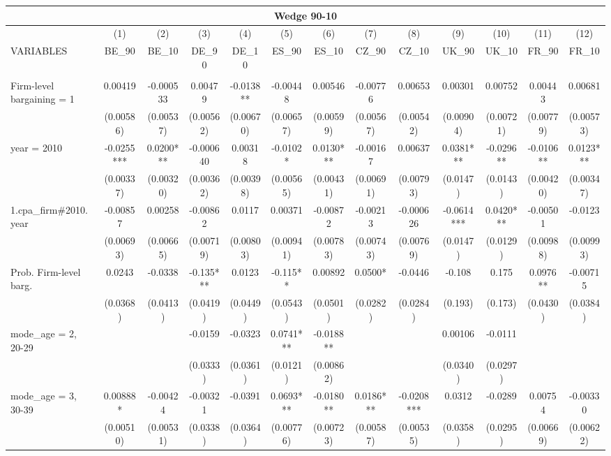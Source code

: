 \documentclass[]{article}
\begin{document}
\begin{tabular}{lcccccccccccc}
\multicolumn{13}{c}{Wedge 90-10} \\ \hline
 & (1) & (2) & (3) & (4) & (5) & (6) & (7) & (8) & (9) & (10) & (11) & (12) \\
VARIABLES & BE\_90 & BE\_10 & DE\_90 & DE\_10 & ES\_90 & ES\_10 & CZ\_90 & CZ\_10 & UK\_90 & UK\_10 & FR\_90 & FR\_10 \\ \hline
 &  &  &  &  &  &  &  &  &  &  &  &  \\
Firm-level bargaining = 1 & 0.00419 & -0.000533 & 0.00479 & -0.0138** & -0.00448 & 0.00546 & -0.00776 & 0.00653 & 0.00301 & 0.00752 & 0.00443 & 0.00681 \\
 & (0.00586) & (0.00537) & (0.00562) & (0.00670) & (0.00657) & (0.00599) & (0.00567) & (0.00542) & (0.00904) & (0.00721) & (0.00779) & (0.00573) \\
year = 2010 & -0.0255*** & 0.0200*** & -0.000640 & 0.00318 & -0.0102* & 0.0130*** & -0.00167 & 0.00637 & 0.0381*** & -0.0296** & -0.0106** & 0.0123*** \\
 & (0.00337) & (0.00320) & (0.00362) & (0.00398) & (0.00565) & (0.00431) & (0.00691) & (0.00793) & (0.0147) & (0.0143) & (0.00420) & (0.00347) \\
1.cpa\_firm\#2010.year & -0.00857 & 0.00258 & -0.00862 & 0.0117 & 0.00371 & -0.00872 & -0.00213 & -0.000626 & -0.0614*** & 0.0420*** & -0.00501 & -0.0123 \\
 & (0.00693) & (0.00665) & (0.00719) & (0.00803) & (0.00941) & (0.00783) & (0.00743) & (0.00769) & (0.0147) & (0.0129) & (0.00988) & (0.00993) \\
Prob. Firm-level barg. & 0.0243 & -0.0338 & -0.135*** & 0.0123 & -0.115** & 0.00892 & 0.0500* & -0.0446 & -0.108 & 0.175 & 0.0976** & -0.00715 \\
 & (0.0368) & (0.0413) & (0.0419) & (0.0449) & (0.0543) & (0.0501) & (0.0282) & (0.0284) & (0.193) & (0.173) & (0.0430) & (0.0384) \\
mode\_age = 2, 20-29 &  &  & -0.0159 & -0.0323 & 0.0741*** & -0.0188** &  &  & 0.00106 & -0.0111 &  &  \\
 &  &  & (0.0333) & (0.0361) & (0.0121) & (0.00862) &  &  & (0.0340) & (0.0297) &  &  \\
mode\_age = 3, 30-39 & 0.00888* & -0.00424 & -0.00321 & -0.0391 & 0.0693*** & -0.0180** & 0.0186*** & -0.0208*** & 0.0312 & -0.0289 & 0.00754 & -0.00330 \\
 & (0.00510) & (0.00531) & (0.0338) & (0.0364) & (0.00776) & (0.00723) & (0.00587) & (0.00535) & (0.0358) & (0.0295) & (0.00669) & (0.00622) \\

\end{tabular}
\end{document}
